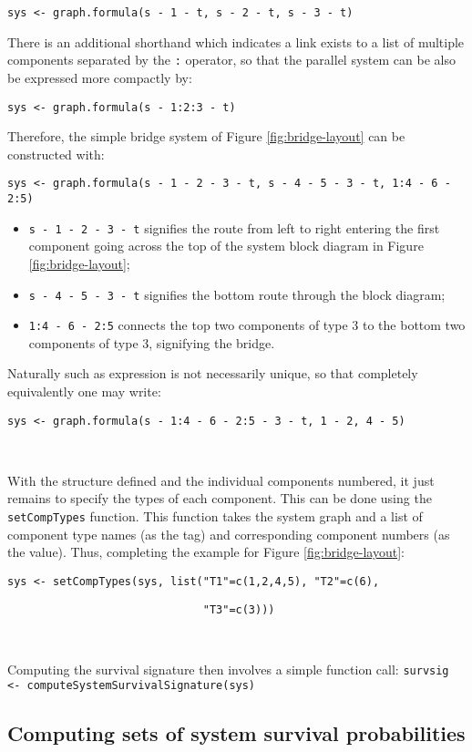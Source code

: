 \documentclass[12pt, a4paper]{elsarticle}
\begin{document}
\noindent\texttt{sys <- graph.formula(s\,-\,1\,-\,t, s\,-\,2\,-\,t, s\,-\,3\,-\,t)}

There is an additional shorthand which indicates a link exists to a list of multiple components separated by the \texttt{:} operator, so that the parallel system can be also be expressed more compactly by:

\noindent\texttt{sys <- graph.formula(s\,-\,1:2:3\,-\,t)}

Therefore, the simple bridge system of Figure \ref{fig:bridge-layout} can be constructed with:

\noindent\texttt{sys <- graph.formula(s\,-\,1\,-\,2\,-\,3\,-\,t, s\,-\,4\,-\,5\,-\,3\,-\,t, 1:4\,-\,6\,-\,2:5)}
\begin{itemize}
  \item \texttt{s\,-\,1\,-\,2\,-\,3\,-\,t} signifies the route from left to right entering the first component going across the top of the system block diagram in Figure \ref{fig:bridge-layout};
  \item \texttt{s\,-\,4\,-\,5\,-\,3\,-\,t} signifies the bottom route through the block diagram;
  \item \texttt{1:4\,-\,6\,-\,2:5} connects the top two components of type 3 to the bottom two components of type 3, signifying the bridge.
\end{itemize}
Naturally such as expression is not necessarily unique, so that completely equivalently one may write:

\noindent\texttt{sys <- graph.formula(s\,-\,1:4\,-\,6\,-\,2:5\,-\,3\,-\,t, 1\,-\,2, 4\,-\,5)}

\ 

With the structure defined and the individual components numbered, it 
just remains to specify the types of each component.  This can be done
using the \texttt{setCompTypes} function.  This function takes the
system graph and a list of component type names (as the tag) and corresponding
component numbers (as the value).  Thus, completing the example for Figure
\ref{fig:bridge-layout}:

\noindent\texttt{sys <- setCompTypes(sys, list("T1"=c(1,2,4,5), "T2"=c(6),}

\noindent\texttt{~~~~~~~~~~~~~~~~~~~~~~~~~~~~~~"T3"=c(3)))}

\ 

Computing the survival signature then involves a simple function call:
\noindent\texttt{survsig <- computeSystemSurvivalSignature(sys)}

\subsection{Computing sets of system survival probabilities}
\end{document}
